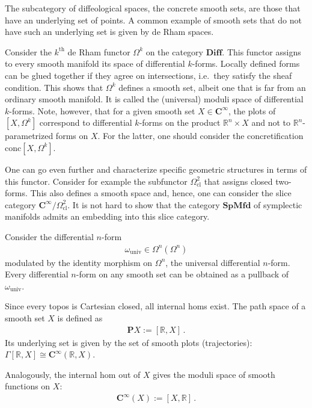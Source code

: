     The subcategory of diffeological spaces, the concrete smooth sets, are those that have an underlying set of points. A common example of smooth sets that do not have such an underlying set is given by de Rham spaces.
    \begin{example}
        Consider the $k^{\text{th}}$ de Rham functor $\Omega^k$ on the category $\mathbf{Diff}$. This functor assigns to every smooth manifold its space of differential $k$-forms. Locally defined forms can be glued together if they agree on intersections, i.e.~they satisfy the sheaf condition. This shows that $\Omega^k$ defines a smooth set, albeit one that is far from an ordinary smooth manifold. It is called the (universal) moduli space of differential $k$-forms. Note, however, that for a given smooth set $X\in\mathbf{C^\infty}$, the plots of $[X,\Omega^k]$ correspond to differential $k$-forms on the product $\mathbb{R}^n\times X$ and not to $\mathbb{R}^n$-parametrized forms on $X$. For the latter, one should consider the concretification $\mathrm{conc}[X,\Omega^k]$.

        One can go even further and characterize specific geometric structures in terms of this functor. Consider for example the subfunctor $\Omega^2_{\text{cl}}$ that assigns closed two-forms. This also defines a smooth space and, hence, one can consider the slice category $\mathbf{C^\infty}/\Omega^2_{\text{cl}}$. It is not hard to show that the category $\mathbf{SpMfd}$ of symplectic manifolds admits an embedding into this slice category.
    \end{example}
    \begin{property}
        Consider the differential $n$-form
        \begin{gather}
            \omega_{\text{univ}}\in\Omega^n(\Omega^n)
        \end{gather}
        modulated by the identity morphism on $\Omega^n$, the universal differential $n$-form. Every differential $n$-form on any smooth set can be obtained as a pullback of $\omega_{\text{univ}}$.
    \end{property}

    \begin{example}
        Since every topos is Cartesian closed, all internal homs exist. The path space of a smooth set $X$ is defined as
        \begin{gather}
            \mathbf{P}X := [\mathbb{R},X]\,.
        \end{gather}
        Its underlying set is given by the set of smooth plots (trajectories): $\Gamma[\mathbb{R},X]\cong\mathbf{C^\infty}(\mathbb{R},X)$.

        Analogously, the internal hom out of $X$ gives the moduli space of smooth functions on $X$:
        \begin{gather}
            \mathbf{C^\infty}(X) := [X,\mathbb{R}]\,.
        \end{gather}
    \end{example}

